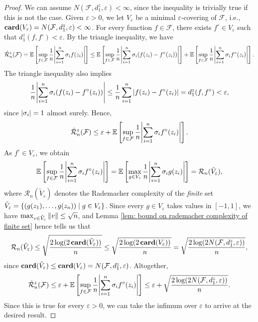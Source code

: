 \begin{proof}
We can assume $N(\mathcal{F}, d_1^z, \varepsilon) < \infty$, since the inequality is trivially true if this is not the case. Given $\varepsilon > 0$, we let $V_{\varepsilon}$ be a minimal $\varepsilon$-covering of $\mathcal{F}$, i.e., $\mathrm{\mathbf{card}}(V_{\varepsilon}) = N(\mathcal{F}, d_1^z, \varepsilon) < \infty$. For every function $f \in \mathcal{F}$, there exists $f^{\circ} \in V_{\varepsilon}$ such that $d_1^z(f, f^{\circ}) < \varepsilon$. By the triangle inequality, we have
\[
    \hat{\mathcal{R}}_n^z(\mathcal{F}) = \mathbb{E}\left[ \sup_{f \in \mathcal{F}} \frac{1}{n} \abs{\sum_{i=1}^n \sigma_i f(z_i)} \right] \leq \mathbb{E}\left[ \sup_{f \in \mathcal{F}} \frac{1}{n} \abs{\sum_{i=1}^n \sigma_i ( f(z_i) - f^{\circ}(z_i))} \right] + \mathbb{E}\left[ \sup_{f \in \mathcal{F}} \frac{1}{n} \abs{\sum_{i=1}^n \sigma_i f^{\circ}(z_i)} \right].
\]
The triangle inequality also implies
\[
    \frac{1}{n} \abs{\sum_{i=1}^n \sigma_i ( f(z_i) - f^{\circ}(z_i))} \leq \frac{1}{n} \sum_{i=1}^n \abs{ f(z_i) - f^{\circ}(z_i) } = d_1^z(f, f^{\circ}) < \varepsilon,
\]
since $\abs{\sigma_i} = 1$ almost surely. Hence,
\[
    \hat{\mathcal{R}}_n^z(\mathcal{F}) \leq \varepsilon + \mathbb{E}\left[ \sup_{f \in \mathcal{F}} \frac{1}{n} \abs{\sum_{i=1}^n \sigma_i f^{\circ}(z_i)} \right].
\]
As $f^{\circ} \in V_{\varepsilon}$, we obtain
\[
    \mathbb{E}\left[ \sup_{f \in \mathcal{F}} \frac{1}{n} \abs{\sum_{i=1}^n \sigma_i f^{\circ}(z_i)} \right] = \mathbb{E}\left[ \max_{g \in V_{\varepsilon}} \frac{1}{n} \abs{\sum_{i=1}^n \sigma_i g(z_i)} \right] = \mathcal{R}_n(\tilde V_{\varepsilon}),
\]
where $\mathcal{R}_n(\tilde V_{\varepsilon})$ denotes the Rademacher complexity of the \emph{finite} set $\tilde V_{\varepsilon} = \left\{ (g(z_1), \dots, g(z_n)) \mathrel{|} g \in V_{\varepsilon} \right\}$. Since every $g \in V_{\varepsilon}$ takes values in $[-1, 1]$, we have $\max_{v \in \tilde V_{\varepsilon}} \norm{v} \leq \sqrt{n}$, and Lemma \ref{lem: bound on rademacher complexity of finite set} hence tells us that
\[
    \mathcal{R}_n(\tilde V_{\varepsilon}) \leq \sqrt{ \frac{2 \, \mathrm{log}(2 \, \mathrm{\mathbf{card}}(\tilde V_{\varepsilon}))}{n} } \leq \sqrt{ \frac{2 \, \mathrm{log}(2 \, \mathrm{\mathbf{card}}(V_{\varepsilon}))}{n} } = \sqrt{ \frac{2 \, \mathrm{log}(2 N(\mathcal{F}, d_1^z, \varepsilon))}{n} },
\]
since $\mathrm{\mathbf{card}}(\tilde V_{\varepsilon}) \leq \mathrm{\mathbf{card}}(V_{\varepsilon}) = N(\mathcal{F}, d_1^z, \varepsilon)$. Altogether,
\[
    \hat{\mathcal{R}}_n^z(\mathcal{F}) \leq \varepsilon + \mathbb{E}\left[ \sup_{f \in \mathcal{F}} \frac{1}{n} \abs{\sum_{i=1}^n \sigma_i f^{\circ}(z_i)} \right] \leq \varepsilon + \sqrt{ \frac{2 \, \mathrm{log}(2 N(\mathcal{F}, d_1^z, \varepsilon))}{n} }.
\]
Since this is true for every $\varepsilon > 0$, we can take the infimum over $\varepsilon$ to arrive at the desired result.
\end{proof}

